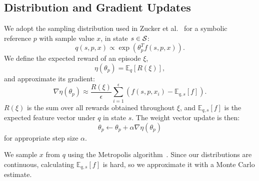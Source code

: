 \subsection{Distribution and Gradient Updates}
We adopt the sampling distribution used in Zucker et al.~\cite{workspacebias}
for a symbolic reference $p$ with sample value $x$, in state $s \in \mathcal{S}$:
$$q(s, p, x) \propto \exp(\theta_{p}^{T} f(s, p, x)).$$
We define the expected reward of an episode $\xi$,
$$\eta(\theta_{p}) = \mathbb{E}_{q}[R(\xi)],$$ and approximate its gradient:
$$\nabla \eta(\theta_{p}) \approx \frac{R(\xi)}{\epsilon} \sum_{i=1}^{\epsilon}(f(s, p, x_{i}) - \mathbb{E}_{q,s}[f]).$$
$R(\xi)$ is the sum over all rewards obtained throughout $\xi$, and
$\mathbb{E}_{q,s}[f]$ is the expected feature vector under $q$ in state $s$. The weight vector update is then:
$$\theta_{p} \leftarrow \theta_{p} + \alpha \nabla \eta(\theta_{p})$$
for appropriate step size $\alpha$.

We sample $x$ from $q$ using the Metropolis algorithm~\cite{chib1995understanding}.
Since our distributions are continuous, calculating $\mathbb{E}_{q,s}[f]$ is hard,
so we approximate it with a Monte Carlo estimate.